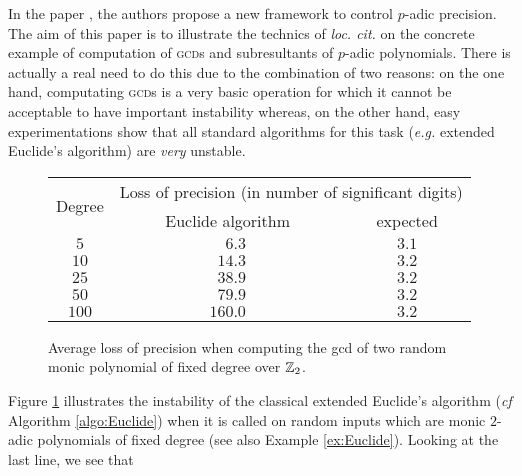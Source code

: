 \documentclass{article}
\begin{document}
In the paper \cite{padicprec}, the authors propose a new framework to 
control $p$-adic precision. The aim of this paper is to illustrate the 
technics of \emph{loc. cit.} on the concrete example of computation of 
\textsc{gcd}s and subresultants of $p$-adic polynomials. There is 
actually a real need to do this due to the combination of two reasons: 
on the one hand, computating \textsc{gcd}s is a very basic operation for 
which it cannot be acceptable to have important instability whereas, on 
the other hand, easy experimentations show that all standard algorithms 
for this task (\emph{e.g.} extended Euclide's algorithm) are \emph{very} 
unstable.
%
\begin{figure}
\renewcommand{\arraystretch}{1.2}
\begin{center}
\begin{tabular}{|c||c|c|}
\hline
\multirow{2}{*}{\hspace{0.2cm}Degree\hspace{0.2cm}\null} & 
\multicolumn{2}{c|}{\hspace{0.1cm}Loss of precision (in number of significant digits)\hspace{0.1cm}\null}\\
\cline{2-3}
& \hspace{0.5cm}Euclide algorithm\hspace{0.5cm}\null & expected \\
\hline
$5$ & $\phantom{00}6.3$ & $3.1$ \\
$10$ & $\phantom{0}14.3$ & $3.2$ \\
$25$ & $\phantom{0}38.9$ & $3.2$ \\
$50$ & $\phantom{0}79.9$ & $3.2$ \\
$100$ & $160.0$ & $3.2$ \\
\hline
\end{tabular}
\end{center}

\vspace{-0.3cm}

\caption{Average loss of precision when computing the {\sc gcd}
of two random monic polynomial of fixed degree over $\mathbb Z_2$.}
\label{fig:precision}

\vspace{-0.3cm}
\end{figure}
%
Figure \ref{fig:precision} illustrates the instability of the classical
extended Euclide's algorithm (\emph{cf} Algorithm \ref{algo:Euclide})
when it is called on random inputs which are monic $2$-adic 
polynomials of fixed degree (see also Example \ref{ex:Euclide}). Looking at the last line, we see that 
\end{document}
